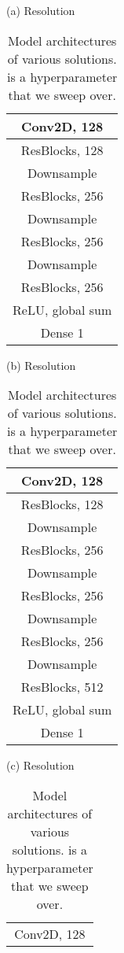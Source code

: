 \documentclass{article} \usepackage{iclr2021_conference,times}
\begin{document}
\begin{table}[ht]
\centering
 \caption{Model architectures of various solutions.  is a hyperparameter that we sweep over.} 
 \footnotesize
 \begin{minipage}[t]{.3\textwidth}
 \centering
 (a) Resolution \\
 \begin{tabular}{c}
    \toprule
     Conv2D, 128 \\
    \midrule
     ResBlocks, 128\\
    Downsample \\
    \midrule
     ResBlocks, 256 \\
    Downsample \\
    \midrule 
      ResBlocks, 256 \\
    Downsample \\
     \midrule 
      ResBlocks, 256 \\
    \midrule 
    ReLU, global sum\\
    Dense 1 \\
    \bottomrule 
\end{tabular}
 \end{minipage}
  \begin{minipage}[t]{.3\textwidth}
  \centering
 (b) Resolution  \\
 \begin{tabular}{c}
    \toprule
     Conv2D, 128 \\
    \midrule
     ResBlocks, 128\\
    Downsample \\
    \midrule
     ResBlocks, 256 \\
    Downsample \\
    \midrule 
    ResBlocks, 256 \\
    Downsample \\
     \midrule 
    ResBlocks, 256 \\
    Downsample \\
     \midrule 
      ResBlocks, 512 \\
    \midrule 
    ReLU, global sum\\
    Dense 1 \\
    \bottomrule 
\end{tabular}
 \end{minipage}
  \begin{minipage}[t]{.3\textwidth}
  \centering
 (c) Resolution  \\
 \begin{tabular}{c}
    \toprule
     Conv2D, 128 \\

\end{tabular}
\end{minipage}
\end{table}
\end{document}
